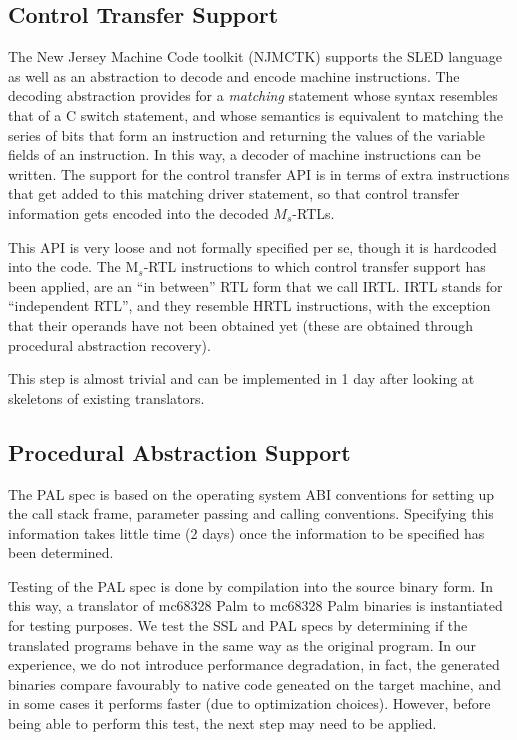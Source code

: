 \subsection{Control Transfer Support}
	The New Jersey Machine Code toolkit (NJMCTK) supports the 
	SLED language as well as an abstraction to decode and encode 
	machine instructions.  The decoding abstraction provides for 
	a \emph{matching} statement whose syntax resembles that of 
	a C switch statement, and whose semantics is equivalent to 
	matching the series of bits that form an instruction and 
	returning the values of the variable fields of an instruction.
	In this way, a decoder of machine instructions can be written. 
	The support for the control transfer API is in terms of 
	extra instructions that get added to this matching driver 
	statement, so that control transfer information gets 
	encoded into the decoded $M_s$-RTLs.    	

	This API is very loose and not formally specified per se, 
	though it is hardcoded into the code.  The M$_s$-RTL instructions
	to which control transfer support has been applied, are an 
	``in between'' RTL form that we call IRTL.  IRTL stands for 
	``independent RTL'', and they resemble HRTL instructions, 
	with the exception that their operands have not been obtained 
	yet (these are obtained through procedural abstraction 
	recovery). 

	This step is almost trivial and can be implemented in 1 day 
	after looking at skeletons of existing translators. 

\subsection{Procedural Abstraction Support}
    The PAL spec is based on the operating system ABI conventions
    for setting up the call stack frame, parameter passing and
    calling conventions.  Specifying this information takes
    little time (2 days) once the information to be specified has
    been determined.  

    Testing of the PAL spec is done by compilation into the
    source binary form.  In this way, a translator of mc68328 Palm
    to mc68328 Palm binaries is instantiated for testing purposes.
    We test the SSL and PAL specs by determining if the translated
    programs behave in the same way as the original program.
    In our experience, we do not introduce performance degradation,
    in fact, the generated binaries compare favourably to native
    code geneated on the target machine, and in some cases it
    performs faster (due to optimization choices).  However, before
	being able to perform this test, the next step may need to 
	be applied. 

